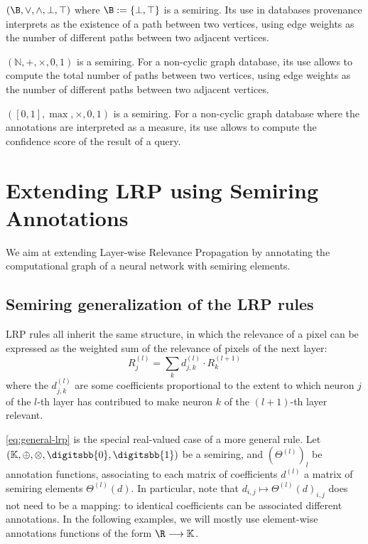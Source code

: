 \documentclass{../cs-classes/cs-classes}
\newcommand*{\K}{\mathbb{K}}
\newcommand*{\1}{\digitsbb{1}}
\newcommand*{\0}{\digitsbb{0}}
\begin{document}
\begin{example}
    $(\B, \lor, \land, \bot, \top)$ where $\B:=\{\bot, \top\}$ is a semiring. Its use in databases provenance interprets as the existence of a path between two vertices, using edge weights as the number of different paths between two adjacent vertices. 
\end{example}

\begin{example}
    $(\mathbb{N}, +, \times, 0, 1)$ is a semiring. For a non-cyclic graph database, its use allows to compute the total number of paths between two vertices, using edge weights as the number of different paths between two adjacent vertices.
\end{example}

\begin{example}
    $([0, 1], \max, \times, 0, 1)$ is a semiring. For a non-cyclic graph database where the annotations are interpreted as a  measure, its use allows to compute the confidence score of the result of a query.
\end{example}

\section{Extending LRP using Semiring Annotations}
We aim at extending Layer-wise Relevance Propagation by annotating the computational graph of a neural network with semiring elements.

\subsection{Semiring generalization of the LRP rules}
LRP rules all inherit the same structure, in which the relevance of a pixel can be expressed as the weighted sum of the relevance of pixels of the next layer:
\begin{equation}
    R_j^{(l)} = \sum_k d_{j, k}^{(l)} \cdot R_k^{(l+1)}
    \label{eq:general-lrp}
\end{equation}
where the $d_{j,k}^{(l)}$ are some coefficients proportional to the extent to which neuron $j$ of the $l$-th layer has contribued to make neuron $k$ of the $(l+1)$-th layer relevant.

\autoref{eq:general-lrp} is the special real-valued case of a more general rule. Let $(\K, \oplus, \otimes, \0, \1)$ be a semiring, and $(\Theta^{(l)})_l$ be annotation functions, associating to each matrix of coefficients $d^{(l)}$ a matrix of semiring elements $\Theta^{(l)}(d)$. In particular, note that $d_{i,j} \mapsto \Theta^{(l)}(d)_{i,j}$ does not need to be a mapping: to identical coefficients can be associated different annotations. In the following examples, we will mostly use element-wise annotations functions of the form $\R\longrightarrow\K$.
\end{document}
